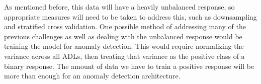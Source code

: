 \documentclass{llncs}
\begin{document}

    
    
    
    As mentioned before, this data will have a heavily unbalanced response, so appropriate measures will need to be taken to address this, such as downsampling and stratified cross validation. One possible method of addressing many of the previous challenges as well as dealing with the unbalanced response would be training the model for anomaly detection. This would require normalizing the variance across all ADLs, then treating that variance as the positive class of a binary response. The amount of data we have to train a positive response will be more than enough for an anomaly detection architecture.
	
\end{document}
